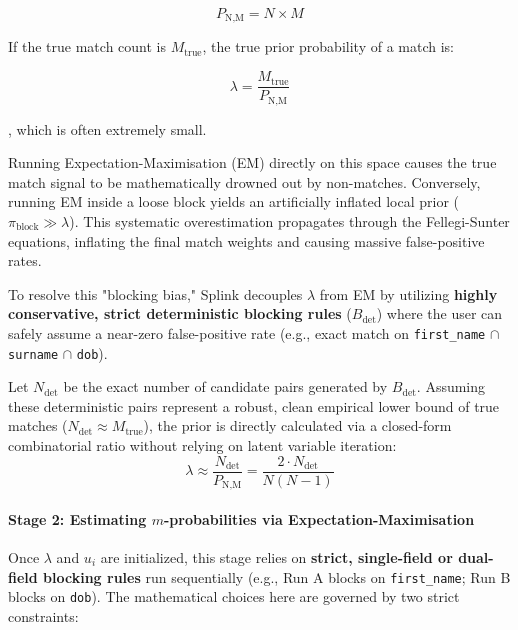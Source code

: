 \begin{equation}
	P_{\text{N,M}} = N \times M
\end{equation}

If the true match count is $M_{\text{true}}$, the true prior probability of a match is:

\begin{equation}
	\lambda = \frac{M_{\text{true}}}{P_{\text{N,M}}}
\end{equation}

, which is often extremely small.

Running Expectation-Maximisation (EM) directly on this space causes the true match signal to be mathematically drowned out by non-matches. Conversely, running EM inside a loose block yields an artificially inflated local prior ($\pi_{\text{block}} \gg \lambda$). This systematic overestimation propagates through the Fellegi-Sunter equations, inflating the final match weights and causing massive false-positive rates.

To resolve this "blocking bias," Splink decouples $\lambda$ from EM by utilizing \textbf{highly conservative, strict deterministic blocking rules} ($B_{\text{det}}$) where the user can safely assume a near-zero false-positive rate (e.g., exact match on \texttt{first\_name} $\cap$ \texttt{surname} $\cap$ \texttt{dob}).

Let $N_{\text{det}}$ be the exact number of candidate pairs generated by $B_{\text{det}}$. Assuming these deterministic pairs represent a robust, clean empirical lower bound of true matches ($N_{\text{det}} \approx M_{\text{true}}$), the prior is directly calculated via a closed-form combinatorial ratio without relying on latent variable iteration:
\begin{equation}
	\lambda \approx \frac{N_{\text{det}}}{P_{\text{N,M}}} = \frac{2 \cdot N_{\text{det}}}{N(N-1)}
\end{equation}

\paragraph{Stage 2: Estimating $m$-probabilities via Expectation-Maximisation}
Once $\lambda$ and $u_i$ are initialized, this stage relies on \textbf{strict, single-field or dual-field blocking rules} run sequentially (e.g., Run A blocks on \texttt{first\_name}; Run B blocks on \texttt{dob}). The mathematical choices here are governed by two strict constraints:

